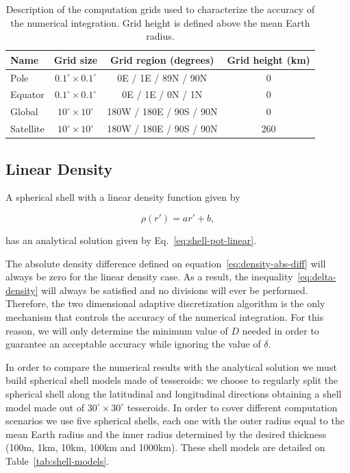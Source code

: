 \documentclass[extra, referee]{gji}
\begin{document}
\begin{table}
\caption{
    Description of the computation grids used to characterize the accuracy of the
    numerical integration.
    Grid height is defined above the mean Earth radius.
}
\label{tab:grids}
\begin{tabular}{lccc}
    Name & Grid size & Grid region (degrees) & Grid height (km)
    \\ \hline
    Pole      & $0.1^\circ \times 0.1^\circ$ &   0E /   1E / 89N / 90N & 0   \\
    Equator   & $0.1^\circ \times 0.1^\circ$ &   0E /   1E /  0N / 1N  & 0   \\
    Global    & $ 10^\circ \times  10^\circ$ & 180W / 180E / 90S / 90N & 0   \\
    Satellite & $ 10^\circ \times  10^\circ$ & 180W / 180E / 90S / 90N & 260 \\
\end{tabular}
\end{table}


\subsection{Linear Density}

A spherical shell with a linear density function given by

\begin{equation}
    \rho(r') = ar' + b,
    \label{eq:density-linear}
\end{equation}

\noindent
has an analytical solution given by Eq.~\ref{eq:shell-pot-linear}.

The absolute density difference defined on equation~\ref{eq:density-abs-diff} will
always be zero for the linear density case.
As a result, the inequality~\ref{eq:delta-density} will always be satisfied and no
divisions will ever be performed.
Therefore, the two dimensional adaptive discretization algorithm is the
only mechanism that controls the accuracy of the numerical integration.
For this reason, we will only determine the minimum value of $D$ needed in order to
guarantee an acceptable accuracy while ignoring the value of $\delta$.

In order to compare the numerical results with the analytical solution we must build
spherical shell models made of tesseroids: we choose to regularly split the spherical
shell along the latitudinal and longitudinal directions obtaining a shell model made out
of $30^\circ \times 30^\circ$ tesseroids.
In order to cover different computation scenarios we use five spherical shells, each one
with the outer radius equal to the mean Earth radius and the inner radius determined by
the desired thickness (100m, 1km, 10km, 100km and 1000km).
These shell models are detailed on Table~\ref{tab:shell-models}.
\end{document}
